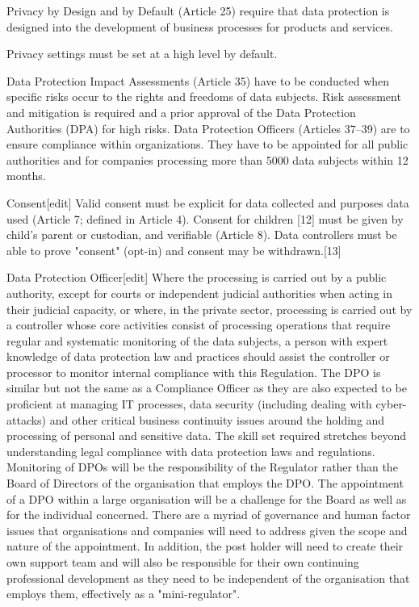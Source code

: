 Privacy by Design and by Default (Article 25) require that data protection is designed into the development of business processes for products and services.

Privacy settings must be set at a high level by default.

Data Protection Impact Assessments (Article 35) have to be conducted when specific risks occur to the rights and freedoms of data subjects. Risk assessment and mitigation is required and a prior approval of the Data Protection Authorities (DPA) for high risks. Data Protection Officers (Articles 37–39) are to ensure compliance within organizations. They have to be appointed for all public authorities and for companies processing more than 5000 data subjects within 12 months.

Consent[edit]
Valid consent must be explicit for data collected and purposes data used (Article 7; defined in Article 4). Consent for children [12] must be given by child’s parent or custodian, and verifiable (Article 8). Data controllers must be able to prove "consent" (opt-in) and consent may be withdrawn.[13]

Data Protection Officer[edit]
Where the processing is carried out by a public authority, except for courts or independent judicial authorities when acting in their judicial capacity, or where, in the private sector, processing is carried out by a controller whose core activities consist of processing operations that require regular and systematic monitoring of the data subjects, a person with expert knowledge of data protection law and practices should assist the controller or processor to monitor internal compliance with this Regulation. The DPO is similar but not the same as a Compliance Officer as they are also expected to be proficient at managing IT processes, data security (including dealing with cyber-attacks) and other critical business continuity issues around the holding and processing of personal and sensitive data. The skill set required stretches beyond understanding legal compliance with data protection laws and regulations. Monitoring of DPOs will be the responsibility of the Regulator rather than the Board of Directors of the organisation that employs the DPO. The appointment of a DPO within a large organisation will be a challenge for the Board as well as for the individual concerned. There are a myriad of governance and human factor issues that organisations and companies will need to address given the scope and nature of the appointment. In addition, the post holder will need to create their own support team and will also be responsible for their own continuing professional development as they need to be independent of the organisation that employs them, effectively as a "mini-regulator".

